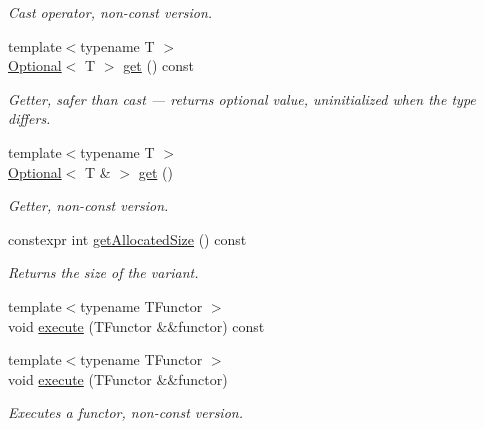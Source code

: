 \begin{DoxyCompactItemize}
\begin{DoxyCompactList}\small\item\em Cast operator, non-\/const version. \end{DoxyCompactList}\item 
\hypertarget{classVariant_a478e263679709c8fd398d2bd27a03e1f}{}\label{classVariant_a478e263679709c8fd398d2bd27a03e1f} 
{\footnotesize template$<$typename T $>$ }\\\hyperlink{classOptional}{Optional}$<$ T $>$ \hyperlink{classVariant_a478e263679709c8fd398d2bd27a03e1f}{get} () const
\begin{DoxyCompactList}\small\item\em Getter, safer than cast --- returns optional value, uninitialized when the type differs. \end{DoxyCompactList}\item 
\hypertarget{classVariant_a2fa43bbec11f3ed48ee0f354a56838f8}{}\label{classVariant_a2fa43bbec11f3ed48ee0f354a56838f8} 
{\footnotesize template$<$typename T $>$ }\\\hyperlink{classOptional}{Optional}$<$ T \& $>$ \hyperlink{classVariant_a2fa43bbec11f3ed48ee0f354a56838f8}{get} ()
\begin{DoxyCompactList}\small\item\em Getter, non-\/const version. \end{DoxyCompactList}\item 
\hypertarget{classVariant_ace236da93590265ede166ca47c3b1f60}{}\label{classVariant_ace236da93590265ede166ca47c3b1f60} 
constexpr int \hyperlink{classVariant_ace236da93590265ede166ca47c3b1f60}{get\+Allocated\+Size} () const
\begin{DoxyCompactList}\small\item\em Returns the size of the variant. \end{DoxyCompactList}\item 
{\footnotesize template$<$typename T\+Functor $>$ }\\void \hyperlink{classVariant_a7a391165290021c00fec1e01059943c7}{execute} (T\+Functor \&\&functor) const
\item 
\hypertarget{classVariant_a4701155a8e941edba3b6480f61b19463}{}\label{classVariant_a4701155a8e941edba3b6480f61b19463} 
{\footnotesize template$<$typename T\+Functor $>$ }\\void \hyperlink{classVariant_a4701155a8e941edba3b6480f61b19463}{execute} (T\+Functor \&\&functor)
\begin{DoxyCompactList}\small\item\em Executes a functor, non-\/const version. \end{DoxyCompactList}\end{DoxyCompactItemize}
